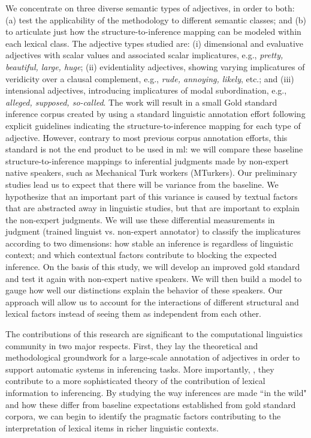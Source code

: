 \documentclass[10pt]{article}
\begin{document}
We concentrate on three diverse semantic types of adjectives, 
in order to both: (a) test the applicability of the methodology to different semantic classes; and (b) to articulate just how the structure-to-inference mapping can be modeled within each lexical class. The adjective types studied are: 
(i) dimensional and evaluative adjectives with scalar values and associated scalar implicatures, e.g., \textit{pretty, beautiful, large, huge}; (ii) evidentiality adjectives, showing varying implicatures of veridicity over a clausal complement, e.g., \textit{rude, annoying, likely}, etc.; and (iii) intensional adjectives, introducing implicatures of modal subordination, e.g., \textit{alleged, supposed, so-called}. The work will result in a small Gold standard inference  corpus created by using a standard linguistic annotation effort following explicit guidelines indicating the structure-to-inference mapping for each type of adjective. However, contrary to most previous corpus annotation efforts, this standard is not the end product to be used in {\sc ml}: we will compare these baseline structure-to-inference mappings to inferential judgments made by non-expert native speakers, such as Mechanical Turk workers (MTurkers). Our preliminary studies lead us to expect that there will be variance from the baseline. We hypothesize that an important part of this variance is caused by textual factors that are abstracted away in linguistic studies, but that are important to explain the non-expert judgments. We will use these differential measurements in judgment (trained linguist vs. non-expert annotator) 
to classify the implicatures according to two dimensions: how stable an inference is regardless of linguistic context; and which contextual factors contribute to blocking the expected inference. On the basis of this study, we will develop an improved gold standard and test it again with non-expert native speakers. We will then build a model to gauge how well our distinctions explain the behavior of these speakers. Our approach will allow us to account for the interactions of different structural and lexical factors instead of seeing them as independent from each other. 

The contributions of this research are significant to the computational linguistics community in two major respects.  First, they lay the theoretical and  methodological groundwork for a large-scale annotation of adjectives in order to support automatic systems in inferencing tasks. More importantly, , they contribute to a more sophisticated theory of the contribution of lexical information to inferencing. By studying the way inferences are made ``in the wild" and how these differ from baseline expectations established from gold standard corpora, we can begin to identify the pragmatic factors contributing to the interpretation of lexical items in richer linguistic contexts.
\end{document}
